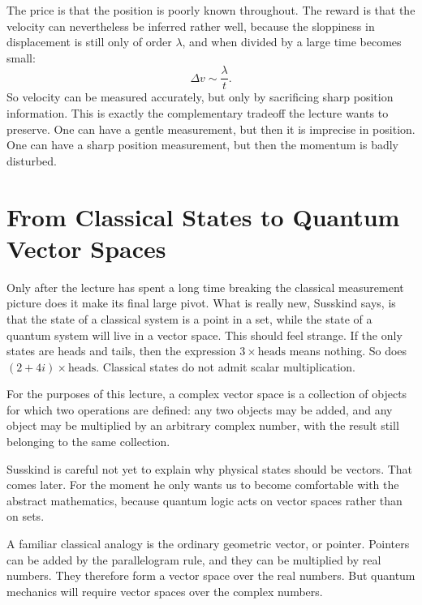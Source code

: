 The price is that the position is poorly known throughout. The reward is that the velocity can nevertheless be inferred rather well, because the sloppiness in displacement is still only of order \(\lambda\), and when divided by a large time becomes small:
\begin{equation}
\Delta v \sim \frac{\lambda}{t}.
\end{equation}
So velocity can be measured accurately, but only by sacrificing sharp position information. This is exactly the complementary tradeoff the lecture wants to preserve. One can have a gentle measurement, but then it is imprecise in position. One can have a sharp position measurement, but then the momentum is badly disturbed.

\section{From Classical States to Quantum Vector Spaces}

Only after the lecture has spent a long time breaking the classical measurement picture does it make its final large pivot. What is really new, Susskind says, is that the state of a classical system is a point in a set, while the state of a quantum system will live in a vector space. This should feel strange. If the only states are heads and tails, then the expression \(3\times\text{heads}\) means nothing. So does \((2+4i)\times\text{heads}\). Classical states do not admit scalar multiplication.

\begin{definition}
For the purposes of this lecture, a complex vector space is a collection of objects for which two operations are defined: any two objects may be added, and any object may be multiplied by an arbitrary complex number, with the result still belonging to the same collection.
\end{definition}

Susskind is careful not yet to explain why physical states should be vectors. That comes later. For the moment he only wants us to become comfortable with the abstract mathematics, because quantum logic acts on vector spaces rather than on sets.

A familiar classical analogy is the ordinary geometric vector, or pointer. Pointers can be added by the parallelogram rule, and they can be multiplied by real numbers. They therefore form a vector space over the real numbers. But quantum mechanics will require vector spaces over the complex numbers.

